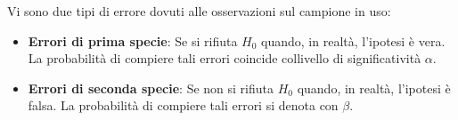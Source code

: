 \documentclass[12pt]{article}
\begin{document}
    Vi sono due tipi di errore dovuti alle osservazioni sul campione in uso: 
    \begin{itemize}
        \item \textbf{Errori di prima specie}: Se si rifiuta $H_0$ quando, in realtà, l’ipotesi è vera. La probabilità di compiere tali errori coincide collivello  di  significatività $\alpha$.
        \item \textbf{Errori di seconda specie}: Se non si rifiuta $H_0$ quando, in realtà, l’ipotesi è falsa. La probabilità di compiere tali errori si denota con $\beta$.
    \end{itemize}
    
\end{document}
